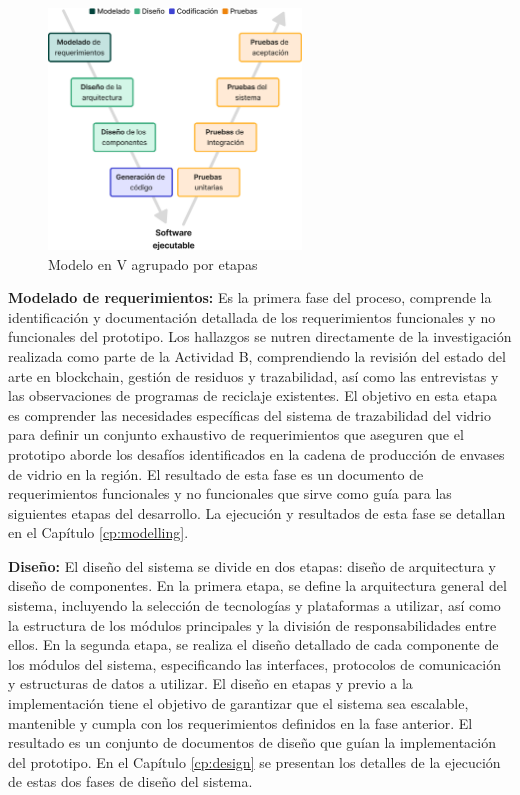 \begin{figure}[!b]
	\centering
	\includegraphics[width=0.6\textwidth]{Figures/model-v-grouped.png}
	\caption{Modelo en V agrupado por etapas}
    \label{fig:methodology-v-grouped}
\end{figure}


\textbf{Modelado de requerimientos:}
Es la primera fase del proceso, comprende la identificación y documentación detallada de los requerimientos funcionales y no funcionales del prototipo.
Los hallazgos se nutren directamente de la investigación realizada como parte de la Actividad B, comprendiendo la revisión del estado del arte en blockchain, gestión de residuos y trazabilidad, así como las entrevistas y las observaciones de programas de reciclaje existentes.
El objetivo en esta etapa es comprender las necesidades específicas del sistema de trazabilidad del vidrio para definir un conjunto exhaustivo de requerimientos que aseguren que el prototipo aborde los desafíos identificados en la cadena de producción de envases de vidrio en la región.
El resultado de esta fase es un documento de requerimientos funcionales y no funcionales que sirve como guía para las siguientes etapas del desarrollo.
La ejecución y resultados de esta fase se detallan en el Capítulo \ref{cp:modelling}.

\textbf{Diseño:}
El diseño del sistema se divide en dos etapas: diseño de arquitectura y diseño de componentes.
En la primera etapa, se define la arquitectura general del sistema, incluyendo la selección de tecnologías y plataformas a utilizar, así como la estructura de los módulos principales y la división de responsabilidades entre ellos.
En la segunda etapa, se realiza el diseño detallado de cada componente de los módulos del sistema, especificando las interfaces, protocolos de comunicación y estructuras de datos a utilizar.
El diseño en etapas y previo a la implementación tiene el objetivo de garantizar que el sistema sea escalable, mantenible y cumpla con los requerimientos definidos en la fase anterior.
El resultado es un conjunto de documentos de diseño que guían la implementación del prototipo. En el Capítulo \ref{cp:design} se presentan los detalles de la ejecución de estas dos fases de diseño del sistema.

